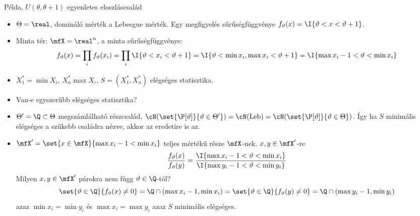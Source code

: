 \documentclass[aspectratio=169,notheorems,9pt,\option]{beamer}
\begin{document}
\begin{frame}{Példa, $U(\theta,\theta+1)$ egyenletes eloszláscsalád}
  \begin{itemize}
    \item $\Theta=\real$, domináló mérték a Lebesgue mérték. 
    Egy megfigyelés sűrűségfüggvénye $f_{\theta}(x)=\I{\theta<x<\theta+1}$.
    \item Minta tér: $\mfX=\real^n$, a minta sűrűségfüggvénye:
    \begin{displaymath}
      f_\theta(x)=\prod_i f_\theta(x_i)
      =\prod_i\I{\theta<x_i<\theta+1}
      =\I{\theta<\min x_i,\max x_i<\theta+1}
      =\I{\max x_i-1<\theta<\min x_i}
    \end{displaymath}
    \item $X_1^*=\min X_i$, $X_n^*\max X_i$, $S=(X_1^*,X_n^*)$ elégséges statisztika.
    \item Van-e egyszerűbb elégséges statisztika?
    \item $\Theta'=\Q\subset\Theta$ megszámlálható részcsalád, 
    $\cN(\set{\P[\theta]}{\theta\in\Theta'})=\cN(\Leb)=\cN(\set{\P[\theta]}{\theta\in \Theta})$. 
    Így ha $S$ minimális  elégséges a szűkebb családra nézve, akkor az eredetire is az.
    \item $\mfX'=\set{x\in\mfX}{\max x_i-1<\min x_i}$ teljes mértékű része $\mfX$-nek. $x,y\in\mfX'$-re
    \begin{displaymath}
      \frac{f_\theta(x)}{f_\theta(y)}=\frac{\I{\max x_i-1<\theta <\min x_i}}{\I{\max y_i-1<\theta<\min y_i}}  
    \end{displaymath}
    Milyen $x,y\in\mfX'$ párokra nem függ $\theta\in\Q$-tól? 
    \begin{displaymath}
      \set{\theta\in\Q}{f_{\theta}(x)\neq0}=\Q\cap(\max x_i-1,\min x_i)=
      \set{\theta\in\Q}{f_{\theta}(y)\neq0}=\Q\cap(\max y_i-1,\min y_i)
    \end{displaymath}
    azaz $\min x_i=\min y_i$ és $\max x_i=\max y_i$ azaz $S$ minimális elégséges.
    \end{itemize}
\end{frame}
\end{document}
